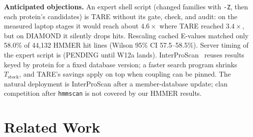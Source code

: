 \documentclass[letterpaper,twocolumn,10pt]{article}
\theoremstyle{definition}
\newcommand{\sys}{TARE\xspace}
\newcommand{\sys}{PARE\xspace}
\begin{document}
\textbf{Anticipated objections.} An expert shell script (changed families with \texttt{-Z}, then each protein's candidates)
is \sys without its gate, check, and audit: on the measured laptop stages it would reach about $4.6\times$ where \sys
reached $3.4\times$, but on DIAMOND it silently drops hits. Rescaling cached E-values matched only 58.0\% of 44{,}132
HMMER hit lines (Wilson 95\% CI 57.5--58.5\%). Server timing of the expert script is \ExpertScriptRatio (PENDING until
W12a lands). InterProScan~\cite{jones2014interproscan} reuses results keyed by protein for a fixed database version; a
faster search program shrinks $T_{\mathrm{stock}}$, and \sys's savings apply on top when coupling can be pinned. The natural
deployment is InterProScan after a member\nobreakdash-database update; clan competition after \texttt{hmmscan} is not covered by
our HMMER results.

\section{Related Work}
\label{sec:related}
\end{document}
